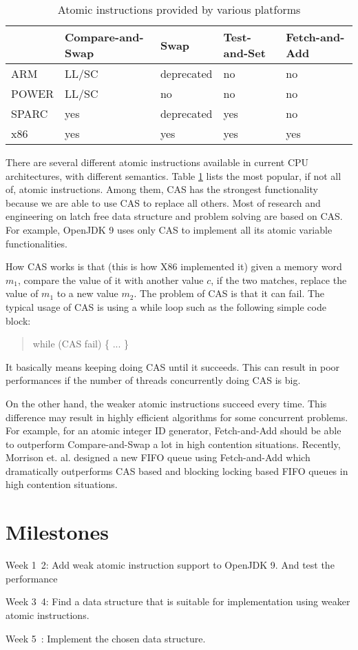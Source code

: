 \documentclass{sig-alternate}
\begin{document}
\begin{table}
  \label{table:atomic_instructions}
  \caption{Atomic instructions provided by various platforms}
  \begin{tabular}{ l || p{1.5cm} | p{1.5cm} | p{1.2cm} | p{1.2cm} }
    & Compare-and-Swap & Swap & Test-and-Set & Fetch-and-Add \\ \hline
    ARM & LL/SC & deprecated & no & no \\
    POWER & LL/SC & no & no & no \\
    SPARC & yes & deprecated & yes & no \\
    x86 & yes & yes& yes & yes \\ \hline
  \end{tabular}
\end{table}


There are several different atomic instructions available in current
CPU architectures, with different semantics. Table
\ref{table:atomic_instructions} lists the most popular, if not all of,
atomic instructions. Among them, CAS has the strongest functionality
because we are able to use CAS to replace all others. Most of research
and engineering on latch free data structure and problem solving are
based on CAS. For example, OpenJDK 9 uses only CAS to implement all
its atomic variable functionalities.

How CAS works is that (this is how X86 implemented it) given a memory
word $m_1$, compare the value of it with another value $c$, if the two
matches, replace the value of $m_1$ to a new value $m_2$.  The problem
of CAS is that it can fail. The typical usage of CAS is using a while
loop such as the following simple code block:

\begin{quote}
  while (CAS fail) \{
    ...
  \} 
\end{quote}

It basically means keeping doing CAS until it succeeds. This can
result in poor performances if the number of threads concurrently
doing CAS is big.


On the other hand, the weaker atomic instructions succeed every time.
This difference may result in highly efficient algorithms for some
concurrent problems. For example, for an atomic integer ID generator,
Fetch-and-Add should be able to outperform Compare-and-Swap a lot
in high contention situations. Recently, Morrison et. al. designed a
new FIFO queue using Fetch-and-Add \cite{Morrison:2013} which
dramatically outperforms CAS based and blocking locking based FIFO
queues in high contention situations.


\section{Milestones}

Week 1~2: Add weak atomic instruction support to OpenJDK 9. And test
the performance 

Week 3~4: Find a data structure that is suitable for implementation
using weaker atomic instructions. 

Week 5~: Implement the chosen data structure.



\end{document}
